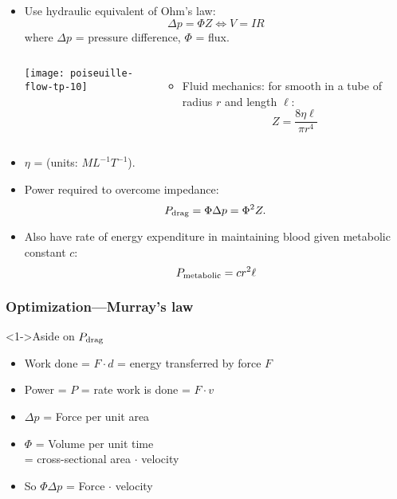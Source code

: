 \begin{frame}

    \begin{itemize}
    \item<1-> Use hydraulic equivalent of Ohm's law:
      $$
      \Delta p = \Phi Z  \Leftrightarrow V = IR
      $$
      where $\Delta p$ = pressure difference, $\Phi$ = flux.
      \begin{columns}
        \texttt{[image: poiseuille-flow-tp-10]}
        \begin{itemize}
        \item<2->
          Fluid mechanics: 
          for smooth 
          in a tube
          of radius $r$ and length $\ell$:
          $$ Z = \frac{8\eta \ell}{\pi r^4} $$
        \end{itemize}
      \end{columns}
    \item<2->
      $\eta$ = 
      (units: $ML^{-1}T^{-1}$).
    \item<3-> 
      Power required to overcome impedance: 
      $$ P_{\textnormal{drag}} = \Phi \Delta p  = \Phi^2 Z. $$
    \item<4-> 
      Also have rate of energy expenditure in maintaining blood
      given metabolic constant $c$:
      $$ P_{\textnormal{metabolic}} = c r^2 \ell  $$
    \end{itemize}

\end{frame}

\begin{frame}
  \frametitle{Optimization---Murray's law}

  \begin{block}<1->{Aside on $P_{\textnormal{drag}}$}
  \begin{itemize}
  \item<2-> 
    Work done = $F \cdot d$ = energy transferred by force $F$
  \item<3-> 
    Power = $P$ = rate work is done = $F \cdot v$
  \item<4-> $\Delta p$ = Force per unit area
  \item<5-> $\Phi$ = Volume per unit time \\ = cross-sectional area $\cdot$ velocity
  \item<6-> So $\Phi \Delta p$ = Force $\cdot$ velocity
  \end{itemize}
  \end{block}

\end{frame}


